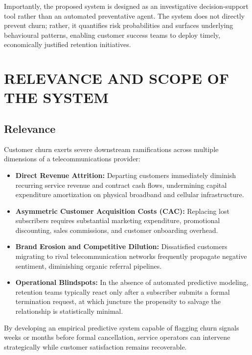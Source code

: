 \documentclass[12pt,a4paper]{report}
\begin{document}
Importantly, the proposed system is designed as an investigative decision-support tool rather than an automated preventative agent. The system does not directly prevent churn; rather, it quantifies risk probabilities and surfaces underlying behavioural patterns, enabling customer success teams to deploy timely, economically justified retention initiatives.

\section{RELEVANCE AND SCOPE OF THE SYSTEM}

\subsection{Relevance}
Customer churn exerts severe downstream ramifications across multiple dimensions of a telecommunications provider:
\begin{itemize}
    \item \textbf{Direct Revenue Attrition:} Departing customers immediately diminish recurring service revenue and contract cash flows, undermining capital expenditure amortization on physical broadband and cellular infrastructure.
    \item \textbf{Asymmetric Customer Acquisition Costs (CAC):} Replacing lost subscribers requires substantial marketing expenditure, promotional discounting, sales commissions, and customer onboarding overhead.
    \item \textbf{Brand Erosion and Competitive Dilution:} Dissatisfied customers migrating to rival telecommunication networks frequently propagate negative sentiment, diminishing organic referral pipelines.
    \item \textbf{Operational Blindspots:} In the absence of automated predictive modeling, retention teams typically react only after a subscriber submits a formal termination request, at which juncture the propensity to salvage the relationship is statistically minimal.
\end{itemize}

By developing an empirical predictive system capable of flagging churn signals weeks or months before formal cancellation, service operators can intervene strategically while customer satisfaction remains recoverable.
\end{document}
